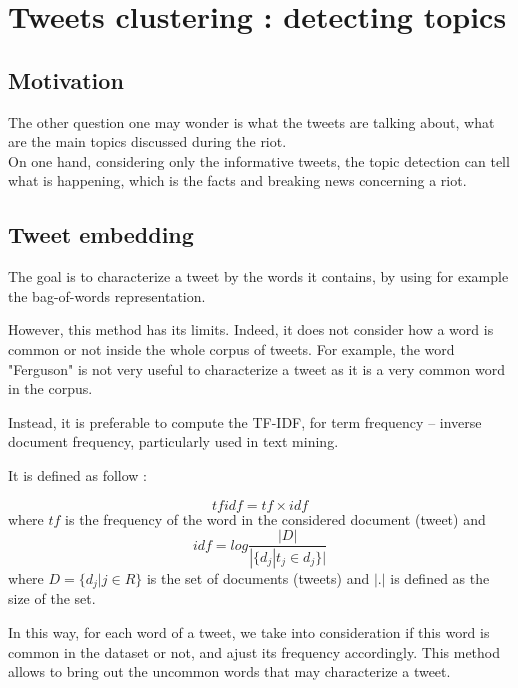 \documentclass[a4paper,twoside,12pt,openright]{report}
\begin{document}

\chapter{Tweets clustering : detecting topics}

\section{Motivation}
The other question one may wonder is what the tweets are talking about, what are the main topics discussed during the riot. \\

On one hand, considering only the informative tweets, the topic detection can tell what is happening, which is the facts and breaking news concerning a riot.
\newpage

\section{Tweet embedding}
\label{tweetEmbeddingSection}

The goal is to characterize a tweet by the words it contains, by using for example the bag-of-words representation.

However, this method has its limits. Indeed, it does not consider how a word is common or not inside the whole corpus of tweets. For example, the word "Ferguson" is not very useful to characterize a tweet as it is a very common word in the corpus.

Instead, it is preferable to compute the TF-IDF, for term frequency – inverse document frequency, particularly used in text mining.

It is defined as follow : 

$$tfidf = tf \times idf$$ 
where 
$tf$ is the frequency of the word in the considered document (tweet) and
$$idf = log \frac{|D|}{|\{d_j | t_j \in d_j\}|}$$
where $D = \{d_j | j\in R\} $ is the set of documents (tweets) and $|.|$ is defined as the size of the set.

In this way, for each word of a tweet, we take into consideration if this word is common in the dataset or not, and ajust its frequency accordingly. This method allows to bring out the uncommon words that may characterize a tweet.
\end{document}
